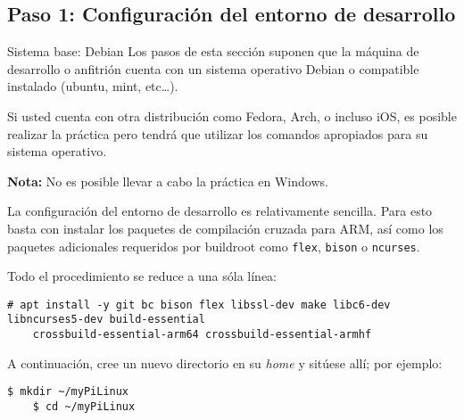 %
%



\subsection{Paso 1: Configuración del entorno de desarrollo}%
\label{sec:step1}%
%
\begin{greenbox}{Sistema base: Debian}
	Los pasos de esta sección suponen que la máquina de desarrollo o anfitrión cuenta con un sistema operativo Debian o compatible instalado (ubuntu, mint, etc\dots{}).

	Si usted cuenta con otra distribución como Fedora, Arch, o incluso iOS, es posible realizar la práctica pero tendrá que utilizar los comandos apropiados para su sistema operativo.

	\medskip{}
	\textbf{Nota:} No es posible llevar a cabo la práctica en Windows.
\end{greenbox}

La configuración del entorno de desarrollo es relativamente sencilla.
Para esto basta con instalar los paquetes de compilación cruzada para ARM, así como los paquetes adicionales requeridos por buildroot como \texttt{flex}, \texttt{bison} o \texttt{ncurses}.

\noindent{}
Todo el procedimiento se reduce a una sóla línea:
\begin{Verbatim}[gobble=1]
	# apt install -y git bc bison flex libssl-dev make libc6-dev libncurses5-dev build-essential
	crossbuild-essential-arm64 crossbuild-essential-armhf
\end{Verbatim}

A continuación, cree un nuevo directorio en su \emph{home} y sitúese allí; por ejemplo:

\begin{Verbatim}[gobble=1]
	$ mkdir ~/myPiLinux
	$ cd ~/myPiLinux
\end{Verbatim}
